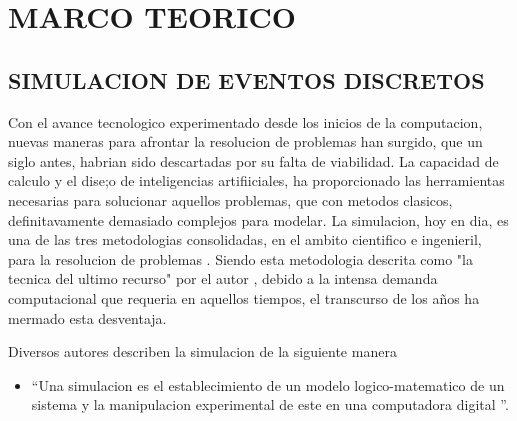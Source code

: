 
\section{MARCO TEORICO}

\subsection{SIMULACION DE EVENTOS DISCRETOS}

Con el avance tecnologico experimentado desde los inicios de la computacion,
nuevas maneras para afrontar la resolucion de problemas han surgido,
que un siglo antes, habrian sido descartadas por su falta de viabilidad.
La capacidad de calculo y el dise;o de inteligencias artifiiciales,
ha proporcionado las herramientas necesarias
para solucionar aquellos problemas, que con metodos clasicos,
definitavamente demasiado complejos para modelar.
La simulacion, hoy en dia, es una de las tres metodologias consolidadas,
en el ambito cientifico e ingenieril,
para la resolucion de problemas \citep{banks1998handbook}.
Siendo esta metodologia descrita como "la tecnica del ultimo recurso"
por el autor \citep{garzia1986discrete},
debido a la intensa demanda computacional que requeria en aquellos tiempos,
el transcurso de los años ha mermado esta desventaja.

Diversos autores describen la simulacion de la siguiente manera

\begin{itemize}
	\item ``Una simulacion es
	el establecimiento de un modelo logico-matematico de un sistema
	y la manipulacion experimental de este en una computadora digital
	\citep{pritsker1974gasp}''.   
\end{itemize}
